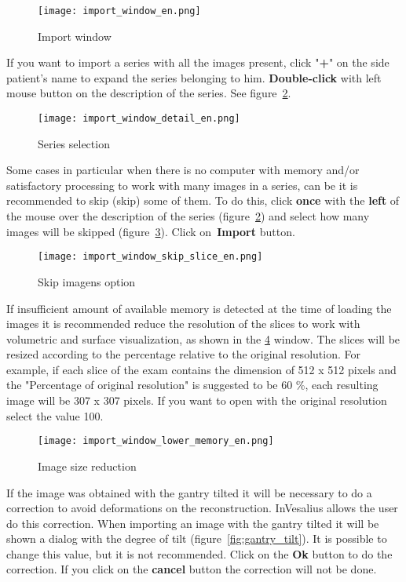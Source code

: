 \begin{figure}[!htb]
\centering
\texttt{[image: import\_window\_en.png]}
\caption{Import window}
\label{fig:win_import}
\end{figure}

\newpage

If you want to import a series with all the images present, click "\textbf{+}" on the side patient's name to expand the series belonging to him. \textbf {Double-click} with left mouse button on the description of the series. See figure~\ref{fig:import_serie}.

\begin{figure}[!htb]
\centering
\texttt{[image: import\_window\_detail\_en.png]}
\caption{Series selection}
\label{fig:import_serie}
\end{figure}
 
Some cases in particular when there is no computer with memory and/or satisfactory processing to work with many images in a series, can be it is recommended to skip (skip) some of them. To do this, click \textbf {once} with the \textbf{left} of the mouse over the description of the series (figure~\ref{fig:import_serie}) and select how many images will be skipped (figure~\ref{fig:skip_image}). Click on~\textbf {Import} button.

\begin{figure}[!htb]
\centering
\texttt{[image: import\_window\_skip\_slice\_en.png]}
\caption{Skip imagens option}
\label{fig:skip_image}
\end{figure}

If insufficient amount of available memory is detected at the time of loading the images it is recommended reduce the resolution of the slices to work with volumetric and surface visualization, as shown in the \ref{fig:resize_image} window.
The slices will be resized according to the percentage relative to the original resolution. For example, if each slice of the exam contains the dimension of 512 x 512 pixels and the "Percentage of original resolution" is suggested to be 60 \%, each resulting image will be 307 x 307 pixels. If you want to open with the original resolution select the value 100.

\begin{figure}[!htb]
\centering
\texttt{[image: import\_window\_lower\_memory\_en.png]}
\caption{Image size reduction}
\label{fig:resize_image}
\end{figure}

If the image was obtained with the gantry tilted it will be necessary to do a correction to avoid deformations on the reconstruction. InVesalius allows the user do this correction. When importing an image with the gantry tilted it will be shown a dialog with the degree of tilt (figure~\ref{fig:gantry_tilt}). It is possible to change this value, but it is not recommended. Click on the \textbf{Ok} button to do the correction. If you click on the \textbf{cancel} button the correction will not be done.

